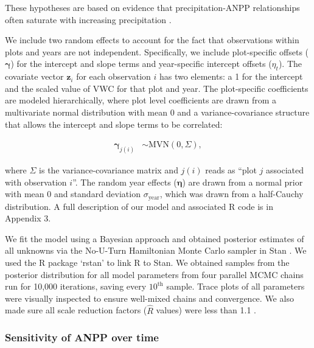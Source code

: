 \documentclass[fleqn,10pt,lineno]{wlpeerj} %
\begin{document}
\noindent{}These hypotheses are based on evidence that
precipitation-ANPP relationships often saturate with increasing
precipitation \citep{Hsu2012, Gherardi2015a}.

We include two random effects to account for the fact that observations
within plots and years are not independent. Specifically, we include
plot-specific offsets (\(\boldsymbol{\gamma}\)) for the intercept and
slope terms and year-specific intercept offsets (\(\eta_t\)). The
covariate vector \(\textbf{z}_i\) for each observation \(i\) has two
elements: a 1 for the intercept and the scaled value of VWC for that
plot and year. The plot-specific coefficients are modeled
hierarchically, where plot level coefficients are drawn from a
multivariate normal distribution with mean 0 and a variance-covariance
structure that allows the intercept and slope terms to be correlated:

\vspace{-1em}

\begin{align}
\boldsymbol{\gamma}_{j(i)} &\sim \text{MVN} \left( 0, \Sigma  \right),
\end{align}

\noindent{}where \(\Sigma\) is the variance-covariance matrix and
\(j(i)\) reads as ``plot \(j\) associated with observation \(i\)''. The
random year effects (\(\boldsymbol{\eta}\)) are drawn from a normal
prior with mean 0 and standard deviation \(\sigma_{\text{year}}\), which
was drawn from a half-Cauchy distribution.
A full description of our model and associated R \citep{R2016} code is
in Appendix 3.

We fit the model using a Bayesian approach and obtained posterior
estimates of all unknowns via the No-U-Turn Hamiltonian Monte Carlo
sampler in Stan \citep{stan2016}. We used the R package `rstan'
\citep{rstan2016} to link R \citep{R2016} to Stan. We obtained samples
from the posterior distribution for all model parameters from four
parallel MCMC chains run for 10,000 iterations, saving every
\(10^{\text{th}}\) sample. Trace plots of all parameters were visually
inspected to ensure well-mixed chains and convergence. We also made sure
all scale reduction factors (\(\hat{R}\) values) were less than 1.1
\citep{Gelman2009}.

\hypertarget{sensitivity-of-anpp-over-time}{%
\subsubsection{Sensitivity of ANPP over
time}\label{sensitivity-of-anpp-over-time}}
\end{document}
